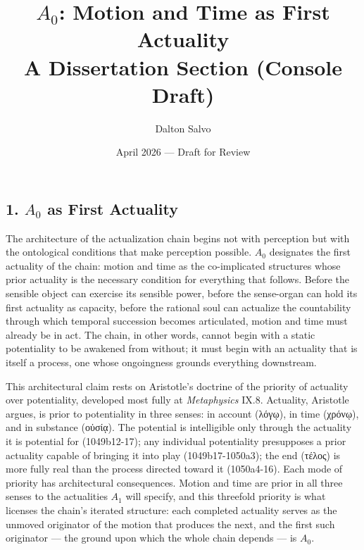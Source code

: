 \documentclass[12pt]{article}
\title{\vspace{-2em}\textbf{$A_0$: Motion and Time as First Actuality}\\[0.5em]
       \large\normalfont A Dissertation Section (Console Draft)}
\author{Dalton Salvo}
\date{April 2026 — Draft for Review}
\newcommand{\gk}[1]{{\greekfont #1}}%
\newcommand{\gk}[1]{{\greekfont #1}}%
\newcommand{\gk}[1]{#1}%
\begin{document}
\maketitle

\thispagestyle{fancy}

\subsection*{1. $A_0$ as First Actuality}

The architecture of the actualization chain begins not with perception but with the ontological conditions that make perception possible. $A_0$ designates the first actuality of the chain: motion and time as the co-implicated structures whose prior actuality is the necessary condition for everything that follows. Before the sensible object can exercise its sensible power, before the sense-organ can hold its first actuality as capacity, before the rational soul can actualize the countability through which temporal succession becomes articulated, motion and time must already be in act. The chain, in other words, cannot begin with a static potentiality to be awakened from without; it must begin with an actuality that is itself a process, one whose ongoingness grounds everything downstream.

This architectural claim rests on Aristotle's doctrine of the priority of actuality over potentiality, developed most fully at \textit{Metaphysics} IX.8. Actuality, Aristotle argues, is prior to potentiality in three senses: in account (\gk{λόγῳ}), in time (\gk{χρόνῳ}), and in substance (\gk{οὐσίᾳ}). The potential is intelligible only through the actuality it is potential for (1049b12-17); any individual potentiality presupposes a prior actuality capable of bringing it into play (1049b17-1050a3); the end (\gk{τέλος}) is more fully real than the process directed toward it (1050a4-16). Each mode of priority has architectural consequences. Motion and time are prior in all three senses to the actualities $A_1$ will specify, and this threefold priority is what licenses the chain's iterated structure: each completed actuality serves as the unmoved originator of the motion that produces the next, and the first such originator --- the ground upon which the whole chain depends --- is $A_0$.
\end{document}
